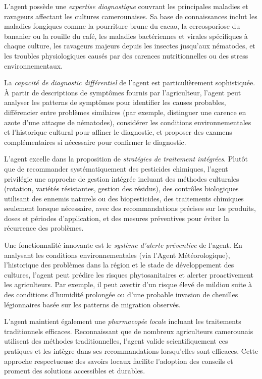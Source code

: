 L'agent possède une \emph{expertise diagnostique} couvrant les principales maladies et ravageurs affectant les cultures camerounaises. Sa base de connaissances inclut les maladies fongiques comme la pourriture brune du cacao, la cercosporiose du bananier ou la rouille du café, les maladies bactériennes et virales spécifiques à chaque culture, les ravageurs majeurs depuis les insectes jusqu'aux nématodes, et les troubles physiologiques causés par des carences nutritionnelles ou des stress environnementaux.

La \emph{capacité de diagnostic différentiel} de l'agent est particulièrement sophistiquée. À partir de descriptions de symptômes fournis par l'agriculteur, l'agent peut analyser les patterns de symptômes pour identifier les causes probables, différencier entre problèmes similaires (par exemple, distinguer une carence en azote d'une attaque de nématodes), considérer les conditions environnementales et l'historique cultural pour affiner le diagnostic, et proposer des examens complémentaires si nécessaire pour confirmer le diagnostic.

L'agent excelle dans la proposition de \emph{stratégies de traitement intégrées}. Plutôt que de recommander systématiquement des pesticides chimiques, l'agent privilégie une approche de gestion intégrée incluant des méthodes culturales (rotation, variétés résistantes, gestion des résidus), des contrôles biologiques utilisant des ennemis naturels ou des biopesticides, des traitements chimiques seulement lorsque nécessaire, avec des recommandations précises sur les produits, doses et périodes d'application, et des mesures préventives pour éviter la récurrence des problèmes.

Une fonctionnalité innovante est le \emph{système d'alerte préventive} de l'agent. En analysant les conditions environnementales (via l'Agent Météorologique), l'historique des problèmes dans la région et le stade de développement des cultures, l'agent peut prédire les risques phytosanitaires et alerter proactivement les agriculteurs. Par exemple, il peut avertir d'un risque élevé de mildiou suite à des conditions d'humidité prolongée ou d'une probable invasion de chenilles légionnaires basée sur les patterns de migration observés.

L'agent maintient également une \emph{pharmacopée locale} incluant les traitements traditionnels efficaces. Reconnaissant que de nombreux agriculteurs camerounais utilisent des méthodes traditionnelles, l'agent valide scientifiquement ces pratiques et les intègre dans ses recommandations lorsqu'elles sont efficaces. Cette approche respectueuse des savoirs locaux facilite l'adoption des conseils et promeut des solutions accessibles et durables.

